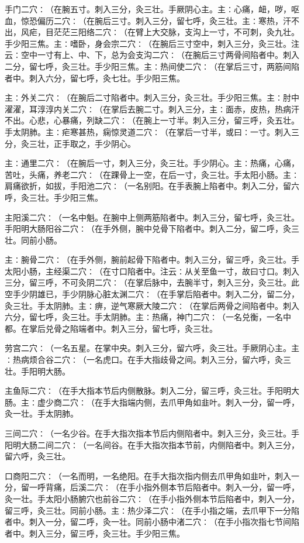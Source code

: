 \documentclass[a4paper,12pt,UTF8,twoside]{ctexbook}
\begin{document}
手门二穴∶（在腕五寸。刺入三分，灸三壮。手厥阴心主。主∶心痛，衄，哕，呕血，惊恐偏历二穴∶（在腕后三寸。刺入三分，留七呼，灸三壮。主∶寒热，汗不出，风疟，目茫茫三阳络二穴∶（在臂上大交脉，支沟上一寸，不可刺，灸九壮。手少阳三焦。主∶嗜卧，身会宗二穴∶（在腕后三寸空中，刺入三分，灸三壮。注云∶空中一寸有上、中、下，总为会支沟二穴∶（在腕后三寸两骨间陷者中。刺入二分，留七呼，灸三壮。手少阳三焦。主∶热间使二穴∶（在掌后三寸，两筋间陷者中。刺入六分，留七呼，灸七壮。手少阳三焦。

主∶外关二穴∶（在腕后二寸陷者中。刺入三分，灸三壮。手少阳三焦。主∶肘中濯濯，耳淳淳内关二穴∶（在掌后去腕二寸。刺入三分，主∶面赤，皮热，热病汗不出。心悲，心暴痛，列缺二穴∶（在腕上一寸半。刺入三分，留三呼，灸五壮。手太阴肺。主∶疟寒甚热，痫惊灵道二穴∶（在掌后一寸半，或曰∶一寸。刺入三分，灸三壮，正手取之，手少阴心。

主∶通里二穴∶（在腕后一寸，刺入三分，灸三壮。手少阴心。主∶热痛，心痛，苦吐，头痛，养老二穴∶（在踝骨上一空，在后一寸，灸三壮。手太阳小肠。主∶肩痛欲折，如拔，手阳池二穴∶（一名别阳。在手表腕上陷者中。刺入二分，留六呼，灸三壮。手少阳三焦。

主阳溪二穴∶（一名中魁。在腕中上侧两筋陷者中。刺入三分，留七呼，灸三壮。手阳明大肠阳谷二穴∶（在手外侧，腕中兑骨下陷者中。刺入二分，留二呼，灸三壮。同前小肠。

主∶腕骨二穴∶（在手外侧，腕前起骨下陷者中。刺入三分，留三呼，灸三壮。手太阳小肠，主经渠二穴∶（在寸口陷者中。注云∶从关至鱼一寸，故曰寸口。刺入三分，留三呼，不可灸阴二穴∶（在掌后脉中，去腕半寸，刺入三分，灸三壮。此空手少阴雄已，手少阴脉心脏太渊二穴∶（在手掌后陷者中。刺入二分，留二分，灸三壮。手太阴肺。主∶痹，逆气寒厥大陵二穴∶（在掌后两骨之间陷者中。刺入六分，留七呼，灸三壮。手太阴肺。主∶热痛，神门二穴∶（一名兑衡，一名中都。在掌后兑骨之陷端者中。刺入三分，留七呼，灸三壮。

劳宫二穴∶（一名五星。在掌中央。刺入三分，留六呼，灸三壮。手厥阴心主。主∶热病烦合谷二穴∶（一名虎口。在手大指歧骨之间。刺入三分，留六呼，灸三壮。手阳明大肠。

主鱼际二穴∶（在手大指本节后内侧散脉。刺入二分，留三呼，灸三壮。手阳明大肠。主∶虚少商二穴∶（在手大指端内侧，去爪甲角如韭叶。刺入一分，留一呼，灸一壮。手太阴肺。

三间二穴∶（一名少谷。在手大指次指本节后内侧陷者中。刺入三分，灸三壮。手阳明大肠二间二穴∶（一名间谷。在手大指次指本节前，内侧陷者中。刺入三分，留六呼，灸三壮。

口商阳二穴∶（一名而明，一名绝阳。在手大指次指内侧去爪甲角如韭叶，刺入一分，留一呼背痛，后溪二穴∶（在手小指外侧本节后陷者中。刺入一分，留一呼，灸一壮。手太阳小肠腑穴也前谷二穴∶（在手小指外侧本节后陷者中，刺入一分，留三呼，灸三壮。同前小肠。主∶热少泽二穴∶（在手小指之端，去爪甲下一分陷者中。刺入一分，留二呼，灸一壮。同前小肠中渚二穴∶（在手小指次指七节间陷者中。刺入三分，留三呼，灸三壮。手少阳三焦。
\end{document}
